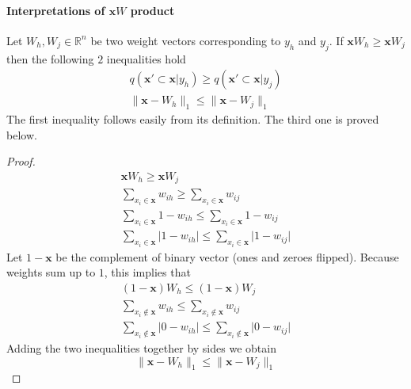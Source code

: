 \documentclass[12pt]{article}
\begin{document}
\paragraph{Interpretations of  $\boldsymbol{x}W$ product}
Let $W_h,W_j \in \mathbb{R}^n$ be two weight vectors corresponding to $y_h$ and $y_j$. If $\boldsymbol{x}W_h \ge \boldsymbol{x}W_j$ then the following $2$ inequalities hold
\begin{gather*}
q(\boldsymbol{x}' \subset \boldsymbol{x} |y_h) \ge q(\boldsymbol{x}' \subset \boldsymbol{x} |y_j) \\
\lVert \boldsymbol{x} - W_h \rVert_1 \le \lVert  \boldsymbol{x} - W_j \rVert_1
\end{gather*}
The first inequality follows easily from its definition. The third one is proved below.
\begin{proof}
	\begin{gather*}
		\boldsymbol{x} W_h \ge \boldsymbol{x} W_j \\
		\sum_{x_i\in\boldsymbol{x} }w_{ih} \ge \sum_{x_i\in\boldsymbol{x} }w_{ij} \\
		\sum_{x_i\in\boldsymbol{x} }1-w_{ih} \le \sum_{x_i\in\boldsymbol{x} }1-w_{ij} \\
		\sum_{x_i\in\boldsymbol{x} }\vert 1-w_{ih}\vert \le \sum_{x_i\in\boldsymbol{x} }\vert 1-w_{ij}\vert
	\end{gather*}
	Let $1-\boldsymbol{x}$ be the complement of binary vector (ones and zeroes flipped). Because weights sum up to $1$, this implies that
	\begin{gather*}
		(1-\boldsymbol{x}) W_h \le (1-\boldsymbol{x}) W_j \\
		\sum_{x_i\notin\boldsymbol{x} }w_{ih} \le \sum_{x_i\notin\boldsymbol{x} }w_{ij} \\
		\sum_{x_i\notin\boldsymbol{x} }\vert 0-w_{ih}\vert \le \sum_{x_i\notin\boldsymbol{x} }\vert 0-w_{ij}\vert
	\end{gather*}
	Adding the two inequalities together by sides we obtain
	\[
	\lVert \boldsymbol{x} - W_h \rVert_1 \le \lVert  \boldsymbol{x} - W_j \rVert_1
	\]
\end{proof}
\end{document}
